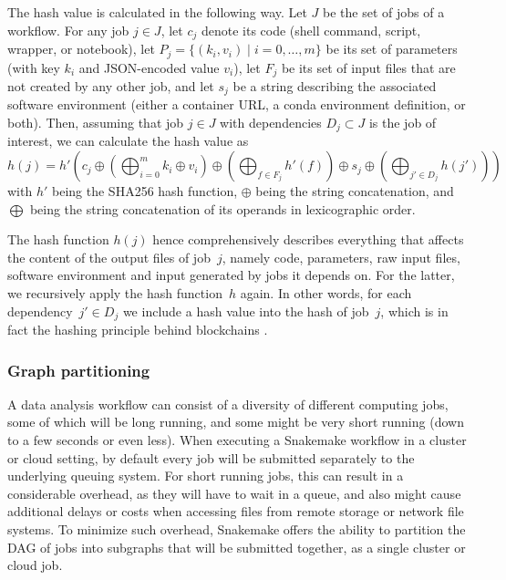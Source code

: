 \documentclass[parskip=half]{scrartcl}
\begin{document}
The hash value is calculated in the following way.
Let $J$ be the set of jobs of a workflow.
For any job $j \in J$, let $c_j$ denote its code (shell command, script, wrapper, or notebook), let $P_j = \{(k_i, v_i) \mid i=0,\dots,m\}$ be its set of parameters (with key $k_i$ and JSON-encoded value $v_i$), let $F_j$ be its set of input files that are not created by any other job, and let $s_j$ be a string describing the associated software environment (either a container URL, a conda environment definition, or both).
Then, assuming that job $j \in J$ with dependencies $D_j \subset J$ is the job of interest, we can calculate the hash value as $$ h(j) = h'\left( c_j \oplus \left(\bigoplus_{i=0}^m k_i \oplus v_i \right) \oplus \left( \bigoplus_{f \in F_j} h'(f) \right) \oplus s_j \oplus \left( \bigoplus_{j' \in D_j} h(j') \right) \right) $$ with $h'$ being the SHA256 \parencite{Handschuh} hash function, $\oplus$ being the string concatenation, and $\bigoplus$ being the string concatenation of its operands in lexicographic order.

The hash function $h(j)$ hence comprehensively describes everything that affects the content of the output files of job~\(j\), namely code, parameters, raw input files, software environment and input generated by jobs it depends on.
For the latter, we recursively apply the hash function~\(h\) again.
In other words, for each dependency~\(j' \in D_j\) we include a hash value into the hash of job~\(j\), which is in fact the hashing principle behind blockchains \parencite{narayanan_bitcoin_2016}.

\subsubsection{Graph partitioning}

A data analysis workflow can consist of a diversity of different computing jobs, some of which will be long running, and some might be very short running (down to a few seconds or even less).
When executing a Snakemake workflow in a cluster or cloud setting, by default every job will be submitted separately to the underlying queuing system.
For short running jobs, this can result in a considerable overhead, as they will have to wait in a queue, and also might cause additional delays or costs when accessing files from remote storage or network file systems.
To minimize such overhead, Snakemake offers the ability to partition the DAG of jobs into subgraphs that will be submitted together, as a single cluster or cloud job.
\end{document}
